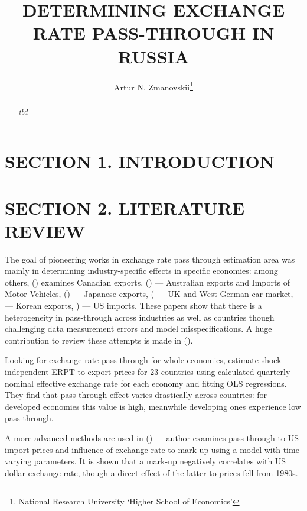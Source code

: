 \documentclass[12pt, a4paper]{extarticle}
\title{{\large DETERMINING EXCHANGE RATE PASS-THROUGH IN RUSSIA}}
\author{Artur N. Zmanovskii\footnote{National Research University `Higher School of Economics'}}
\date{}
\begin{document}
\setcounter{page}{2}
\begin{abstract}
	\textit{tbd}
\end{abstract}
\newpage

\tableofcontents
\linespread{1.5}

\newpage
\linespread{1.5}

\section*{SECTION 1. INTRODUCTION}

\newpage
\section*{SECTION 2. LITERATURE REVIEW}
\setcounter{section}{2}
The goal of pioneering works in exchange rate pass through estimation area was mainly in determining industry-specific effects in specific economies: among others, (\cite{Schembri1985}) examines Canadian exports, (\cite{Menon1992, Menon1993}) --- Australian exports and Imports of Motor Vehicles, (\cite{Khosla1991, Athukorala1994}) --- Japanese exports, (\cite{Cowling1989} --- UK and West German car market, \cite{Athukorala1991} --- Korean exports, \cite{Baldwin1988, Feenstra1989, Hooper1989}) --- US imports. These papers show that there is a heterogeneity in pass-through across industries as well as countries though challenging data measurement errors and model misspecifications. A huge contribution to review these attempts is made in (\cite{Menon1993, Menon1995}).

Looking for exchange rate pass-through for whole economies, \autocite{Khosla1989} estimate shock-independent ERPT to export prices for 23 countries using calculated quarterly nominal effective exchange rate for each economy and fitting OLS regressions. They find that pass-through effect varies drastically across countries: for developed economies this value is high, meanwhile developing ones experience low pass-through.

A more advanced methods are used in (\cite{Kim1990}) --- author examines pass-through to US import prices and influence of exchange rate to mark-up using a model with time-varying parameters. It is shown that a mark-up negatively correlates with US dollar exchange rate, though a direct effect of the latter to prices fell from 1980s. 
\end{document}
